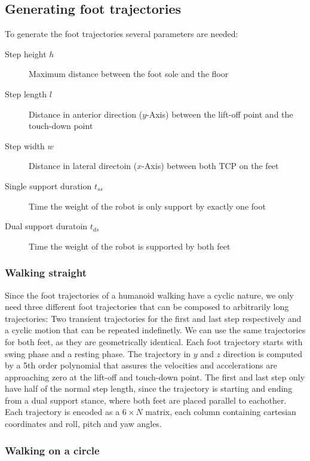 \documentclass[english,ngerman]{KITreprt}
\newcommand{\clr}[2]{{\color{#1}{#2}}}
\newcommand{\todo}[1]{\marginpar{\clr{red}{#1}}}
\begin{document}
\subsection{Generating foot
trajectories}\label{generating-foot-trajectories}

To generate the foot trajectories several parameters are needed:

\todo{table with used parameters}

\begin{description}
\item[Step height $h$]
Maximum distance between the foot sole and the floor
\item[Step length $l$]
Distance in anterior direction ($y$-Axis) between the lift-off point and
the touch-down point
\item[Step width $w$]
Distance in lateral directoin ($x$-Axis) between both TCP on the feet
\item[Single support duration $t_{ss}$]
Time the weight of the robot is only support by exactly one foot
\item[Dual support duratoin $t_{ds}$]
Time the weight of the robot is supported by both feet
\end{description}

\subsubsection{Walking straight}\label{walking-straight}

Since the foot trajectories of a humanoid walking have a cyclic nature,
we only need three different foot trajectories that can be composed to
arbitrarily long trajectories: Two transient trajectories for the first
and last step respectively and a cyclic motion that can be repeated
indefinetly. We can use the same trajectories for both feet, as they are
geometrically identical. Each foot trajectory starts with swing phase
and a resting phase. The trajectory in $y$ and $z$ direction is computed
by a 5th order polynomial that assures the velocities and accelerations
are approaching zero at the lift-off and touch-down point. The first and
last step only have half of the normal step length, since the trajectory
is starting and ending from a dual support stance, where both feet are
placed parallel to eachother. Each trajectory is encoded as a
$6 \times N$ matrix, each column containing cartesian coordinates and
roll, pitch and yaw angles.

\subsubsection{Walking on a circle}\label{walking-on-a-circle}
\end{document}
